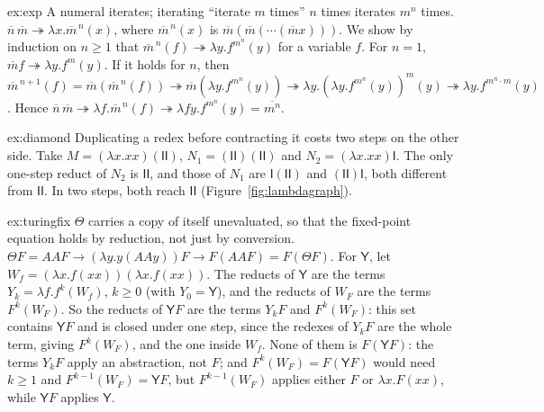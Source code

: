 \begin{solution}{ex:exp}
\idea A numeral iterates; iterating ``iterate $m$ times'' $n$ times iterates $m^n$ times.
\writeup $\overline n\,\overline m\twoheadrightarrow\lambda x.\overline m^{\,n}(x)$, where $\overline m^{\,n}(x)$ is $\overline m(\overline m(\cdots(\overline mx)))$. We show by induction on $n\ge1$ that $\overline m^{\,n}(f)\twoheadrightarrow\lambda y.f^{m^n}(y)$ for a variable $f$. For $n=1$, $\overline mf\twoheadrightarrow\lambda y.f^m(y)$. If it holds for $n$, then $\overline m^{\,n+1}(f)=\overline m(\overline m^{\,n}(f))\twoheadrightarrow\overline m(\lambda y.f^{m^n}(y))\twoheadrightarrow\lambda y.(\lambda y.f^{m^n}(y))^m(y)\twoheadrightarrow\lambda y.f^{m^n\cdot m}(y)$. Hence $\overline n\,\overline m\twoheadrightarrow\lambda f.\overline m^{\,n}(f)\twoheadrightarrow\lambda fy.f^{m^n}(y)=\overline{m^n}$.
\end{solution}

\begin{solution}{ex:diamond}
\idea Duplicating a redex before contracting it costs two steps on the other side.
\writeup Take $M=(\lambda x.xx)(\mathsf I\mathsf I)$, $N_1=(\mathsf I\mathsf I)(\mathsf I\mathsf I)$ and $N_2=(\lambda x.xx)\mathsf I$. The only one-step reduct of $N_2$ is $\mathsf I\mathsf I$, and those of $N_1$ are $\mathsf I(\mathsf I\mathsf I)$ and $(\mathsf I\mathsf I)\mathsf I$, both different from $\mathsf I\mathsf I$. In two steps, both reach $\mathsf I\mathsf I$ (Figure~\ref{fig:lambdagraph}).
\end{solution}

\begin{solution}{ex:turingfix}
\idea $\Theta$ carries a copy of itself unevaluated, so that the fixed-point equation holds by reduction, not just by conversion.
\writeup $\Theta F=AAF\to(\lambda y.y(AAy))F\to F(AAF)=F(\Theta F)$. For $\mathsf Y$, let $W_f=(\lambda x.f(xx))(\lambda x.f(xx))$. The reducts of $\mathsf Y$ are the terms $Y_k=\lambda f.f^k(W_f)$, $k\ge0$ (with $Y_0=\mathsf Y$), and the reducts of $W_F$ are the terms $F^k(W_F)$. So the reducts of $\mathsf YF$ are the terms $Y_kF$ and $F^k(W_F)$: this set contains $\mathsf YF$ and is closed under one step, since the redexes of $Y_kF$ are the whole term, giving $F^k(W_F)$, and the one inside $W_f$. None of them is $F(\mathsf YF)$: the terms $Y_kF$ apply an abstraction, not $F$; and $F^k(W_F)=F(\mathsf YF)$ would need $k\ge1$ and $F^{k-1}(W_F)=\mathsf YF$, but $F^{k-1}(W_F)$ applies either $F$ or $\lambda x.F(xx)$, while $\mathsf YF$ applies $\mathsf Y$.
\end{solution}

